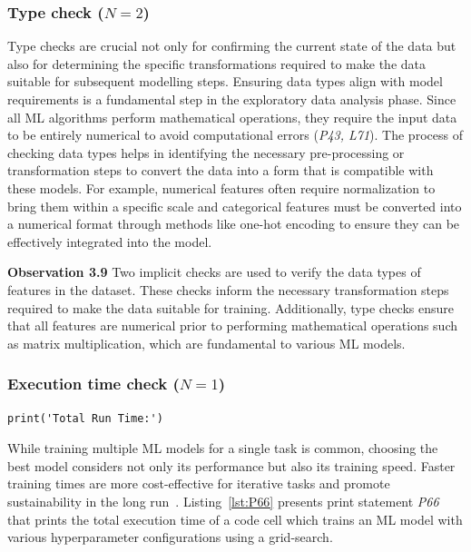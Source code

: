\documentclass[smallextended]{svjour3}       %
\newcommand{\highlight}[1]{\begin{framed}%
  \noindent#1
\end{framed}}
\begin{document}
\subsubsection{Type check ($N = 2$)}

Type checks are crucial not only for confirming the current state of the data but also for determining the specific transformations required to make the data suitable for subsequent modelling steps. Ensuring data types align with model requirements is a fundamental step in the exploratory data analysis phase. Since all ML algorithms perform mathematical operations, they require the input data to be entirely numerical to avoid computational errors (\emph{P43, L71}). The process of checking data types helps in identifying the necessary pre-processing or transformation steps to convert the data into a form that is compatible with these models. For example, numerical features often require normalization to bring them within a specific scale and categorical features must be converted into a numerical format through methods like one-hot encoding to ensure they can be effectively integrated into the model.

\highlight{\textbf{Observation 3.9} Two implicit checks are used to verify the data types of features in the dataset. These checks inform the necessary transformation steps required to make the data suitable for training. Additionally, type checks ensure that all features are numerical prior to performing mathematical operations such as matrix multiplication, which are fundamental to various ML models.}

\subsubsection{Execution time check ($N = 1$)}
\begin{lstlisting}[caption={Print statement \emph{P66} used to check the total execution time of training an ML model with various hyper-parameter configurations.}, label={lst:P66}]
print('Total Run Time:')
\end{lstlisting}

While training multiple ML models for a single task is common, choosing the best model considers not only its performance but also its training speed. Faster training times are more cost-effective for iterative tasks and promote sustainability in the long run~\citep{shome2022data}. Listing~\ref{lst:P66} presents print statement \emph{P66} that prints the total execution time of a code cell which trains an ML model with various hyperparameter configurations using a grid-search.
\end{document}
